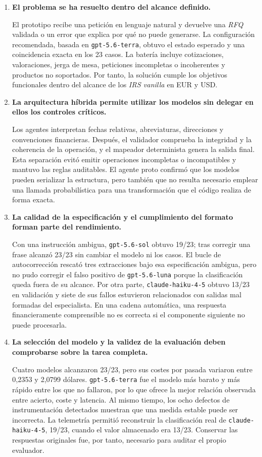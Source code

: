 \begin{enumerate}
    \item \textbf{El problema se ha resuelto dentro del alcance definido.}

    El prototipo recibe una petición en lenguaje natural y devuelve una \textit{RFQ} validada o un error que explica por qué no puede generarse. La configuración recomendada, basada en \texttt{gpt-5.6-terra}, obtuvo el estado esperado y una coincidencia exacta en los 23 casos. La batería incluye cotizaciones, valoraciones, jerga de mesa, peticiones incompletas o incoherentes y productos no soportados. Por tanto, la solución cumple los objetivos funcionales dentro del alcance de los \textit{IRS vanilla} en EUR y USD.

    \item \textbf{La arquitectura híbrida permite utilizar los modelos sin delegar en ellos los controles críticos.}

    Los agentes interpretan fechas relativas, abreviaturas, direcciones y convenciones financieras. Después, el validador comprueba la integridad y la coherencia de la operación, y el mapeador determinista genera la salida final. Esta separación evitó emitir operaciones incompletas o incompatibles y mantuvo las reglas auditables. El agente proto confirmó que los modelos pueden serializar la estructura, pero también que no resulta necesario emplear una llamada probabilística para una transformación que el código realiza de forma exacta.


    \item \textbf{La calidad de la especificación y el cumplimiento del formato forman parte del rendimiento.}

    Con una instrucción ambigua, \texttt{gpt-5.6-sol} obtuvo 19/23; tras corregir una frase alcanzó 23/23 sin cambiar el modelo ni los casos. El bucle de autocorrección rescató tres extracciones bajo esa especificación ambigua, pero no pudo corregir el falso positivo de \texttt{gpt-5.6-luna} porque la clasificación queda fuera de su alcance. Por otra parte, \texttt{claude-haiku-4-5} obtuvo 13/23 en validación y siete de sus fallos estuvieron relacionados con salidas mal formadas del especialista. En una cadena automática, una respuesta financieramente comprensible no es correcta si el componente siguiente no puede procesarla.

    \item \textbf{La selección del modelo y la validez de la evaluación deben comprobarse sobre la tarea completa.}

    Cuatro modelos alcanzaron 23/23, pero sus costes por pasada variaron entre 0,2353 y 2,0799 dólares. \texttt{gpt-5.6-terra} fue el modelo más barato y más rápido entre los que no fallaron, por lo que ofrece la mejor relación observada entre acierto, coste y latencia. Al mismo tiempo, los ocho defectos de instrumentación detectados muestran que una medida estable puede ser incorrecta. La telemetría permitió reconstruir la clasificación real de \texttt{claude-haiku-4-5}, 19/23, cuando el valor almacenado era 13/23. Conservar las respuestas originales fue, por tanto, necesario para auditar el propio evaluador.
\end{enumerate}


